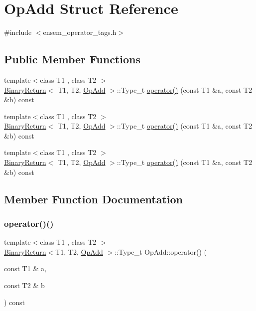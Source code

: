 \hypertarget{structOpAdd}{}\section{Op\+Add Struct Reference}
\label{structOpAdd}


{\ttfamily \#include $<$ensem\+\_\+operator\+\_\+tags.\+h$>$}

\subsection*{Public Member Functions}
\begin{DoxyCompactItemize}
\item 
{\footnotesize template$<$class T1 , class T2 $>$ }\\\mbox{\hyperlink{structBinaryReturn}{Binary\+Return}}$<$ T1, T2, \mbox{\hyperlink{structOpAdd}{Op\+Add}} $>$\+::Type\+\_\+t \mbox{\hyperlink{structOpAdd_a1eeb43f9d50d80994b1d2fe141bca73b}{operator()}} (const T1 \&a, const T2 \&b) const
\item 
{\footnotesize template$<$class T1 , class T2 $>$ }\\\mbox{\hyperlink{structBinaryReturn}{Binary\+Return}}$<$ T1, T2, \mbox{\hyperlink{structOpAdd}{Op\+Add}} $>$\+::Type\+\_\+t \mbox{\hyperlink{structOpAdd_a1eeb43f9d50d80994b1d2fe141bca73b}{operator()}} (const T1 \&a, const T2 \&b) const
\item 
{\footnotesize template$<$class T1 , class T2 $>$ }\\\mbox{\hyperlink{structBinaryReturn}{Binary\+Return}}$<$ T1, T2, \mbox{\hyperlink{structOpAdd}{Op\+Add}} $>$\+::Type\+\_\+t \mbox{\hyperlink{structOpAdd_a1eeb43f9d50d80994b1d2fe141bca73b}{operator()}} (const T1 \&a, const T2 \&b) const
\end{DoxyCompactItemize}


\subsection{Member Function Documentation}
\mbox{\label{structOpAdd_a1eeb43f9d50d80994b1d2fe141bca73b}} 
\subsubsection{\texorpdfstring{operator()()}{operator()()}\hspace{0.1cm}{\footnotesize\ttfamily [1/3]}}
{\footnotesize\ttfamily template$<$class T1 , class T2 $>$ \\
\mbox{\hyperlink{structBinaryReturn}{Binary\+Return}}$<$T1, T2, \mbox{\hyperlink{structOpAdd}{Op\+Add}} $>$\+::Type\+\_\+t Op\+Add\+::operator() (\begin{DoxyParamCaption}\item[{const T1 \&}]{a,  }\item[{const T2 \&}]{b }\end{DoxyParamCaption}) const\hspace{0.3cm}{\ttfamily [inline]}}

